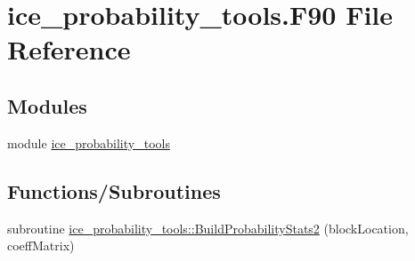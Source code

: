 \hypertarget{ice__probability__tools_8F90}{
\section{ice\_\-probability\_\-tools.F90 File Reference}
\label{ice__probability__tools_8F90}
}
\subsection*{Modules}
\begin{DoxyCompactItemize}
\item 
module \hyperlink{namespaceice__probability__tools}{ice\_\-probability\_\-tools}
\end{DoxyCompactItemize}
\subsection*{Functions/Subroutines}
\begin{DoxyCompactItemize}
\item 
subroutine \hyperlink{namespaceice__probability__tools_a606ed01210f43ca631f18ef6aeb76170}{ice\_\-probability\_\-tools::BuildProbabilityStats2} (blockLocation, coeffMatrix)
\end{DoxyCompactItemize}
